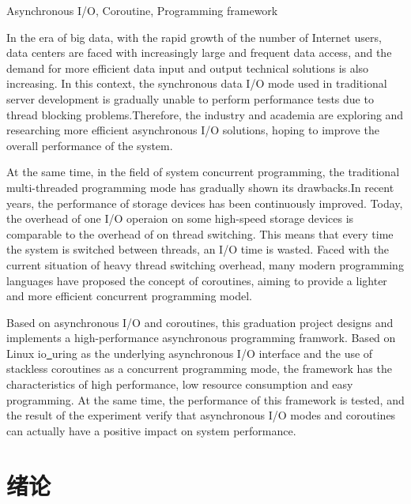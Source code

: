 \documentclass[supercite]{HustGraduPaper}
\theoremstyle{definition}
\begin{document}
\begin{enabstract}{Asynchronous I/O, Coroutine, Programming framework}

In the era of big data, with the rapid growth of the number of Internet users, data centers
are faced with increasingly large and frequent data access, and the demand for more efficient
data input and output technical solutions is also increasing. In this context, the synchronous
data I/O mode used in traditional server development is gradually unable to perform performance
tests due to thread blocking problems.Therefore, the industry and academia are exploring and
researching more efficient asynchronous I/O solutions, hoping to improve the overall performance
of the system.\par

At the same time, in the field of system concurrent programming, the traditional multi-threaded
programming mode has gradually shown its drawbacks.In recent years, the performance of storage
devices has been continuously improved. Today, the overhead of one I/O operaion on some high-speed
storage devices is comparable to the overhead of on thread switching. This means that every time
the system is switched between threads, an I/O time is wasted. Faced with the current situation
of heavy thread switching overhead, many modern programming languages have proposed the concept
of coroutines, aiming to provide a lighter and more efficient concurrent programming model.\par

Based on asynchronous I/O and coroutines, this graduation project designs and implements a
high-performance asynchronous programming framwork. Based on Linux io\underline{~}uring as
the underlying asynchronous I/O interface and the use of stackless coroutines as a concurrent
programming mode, the framework has the characteristics of high performance, low resource consumption
and easy programming. At the same time, the performance of this framework is tested, and the
result of the experiment verify that asynchronous I/O modes and coroutines can actually have a
positive impact on system performance.\par

\end{enabstract}

\tableofcontents[level=2]
\clearpage


\section{绪论}
\end{document}
